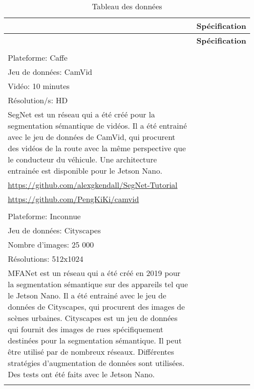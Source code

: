 {
   \newcommand\rownumber{\stepcounter{magicrownumbers}\arabic{magicrownumbers}}
   \vspace{0.1em} %
   \begin{longtable}[t]{@{}p{1em}|p{35em}} %
      \caption{Tableau des données}\label{tab:datasets}\\
      & \textbf{Spécification} \\
      \hline
      \endfirsthead
      & \textbf{Spécification} \\
      \hline
      \endhead
      \endfoot
      \endlastfoot
      \hline
      \rownumber & \begin{tabular}[t]{@{}p{35em}@{}}
         Architecture: SegNet\\Plateforme: Caffe\\Jeu de données: CamVid\\Vidéo: 10 minutes\\Résolution/s: HD\\
         \hline
         SegNet est un réseau qui a été créé pour la segmentation sémantique de vidéos. Il a été entrainé avec le jeu de données de CamVid, qui procurent des vidéos de la route avec la même perspective que le conducteur du véhicule. Une architecture entrainée est disponible pour le Jetson Nano.\\
         \url{https://github.com/alexgkendall/SegNet-Tutorial}\\\url{https://github.com/PengKiKi/camvid}
      \end{tabular}\\
      \hline
      \rownumber & \begin{tabular}[t]{@{}p{35em}@{}}
         Architecture: MFANet\\Plateforme: Inconnue\\Jeu de données: Cityscapes\\Nombre d'images: 25 000\\Résolutions: 512x1024\\
         \hline
         MFANet\parencite{zheng_real-time_2020} est un réseau qui a été créé en 2019 pour la segmentation sémantique sur des appareils tel que le Jetson Nano. Il a été entrainé avec le jeu de données de Cityscapes, qui procurent des images de scènes urbaines. Cityscapes est un jeu de données qui fournit des images de rues spécifiquement destinées pour la segmentation sémantique. Il peut être utilisé par de nombreux réseaux. Différentes stratégies d'augmentation de données sont utilisées. Des tests ont été faits avec le Jetson Nano.\\

\end{tabular}
\end{longtable}}

